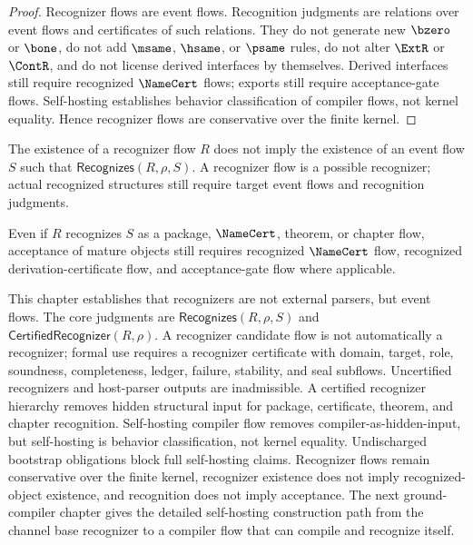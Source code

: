 \begin{proof}
Recognizer flows are event flows. Recognition judgments are relations over event flows and certificates of such relations. They do not generate new $\bzero$ or $\bone$, do not add $\msame$, $\hsame$, or $\psame$ rules, do not alter $\ExtR$ or $\ContR$, and do not license derived interfaces by themselves. Derived interfaces still require recognized $\NameCert$ flows; exports still require acceptance-gate flows. Self-hosting establishes behavior classification of compiler flows, not kernel equality. Hence recognizer flows are conservative over the finite kernel.
\end{proof}

\begin{corollary}
\label{cor:recognizer-generated-existence-not-object-existence}
The existence of a recognizer flow $R$ does not imply the existence of an event flow $S$ such that $\mathsf{Recognizes}(R,\rho,S)$. A recognizer flow is a possible recognizer; actual recognized structures still require target event flows and recognition judgments.
\end{corollary}

\begin{corollary}
\label{cor:recognizer-generated-recognition-not-acceptance}
Even if $R$ recognizes $S$ as a package, $\NameCert$, theorem, or chapter flow, acceptance of mature objects still requires recognized $\NameCert$ flow, recognized derivation-certificate flow, and acceptance-gate flow where applicable.
\end{corollary}

\begin{remark}[Outlook]
\label{rem:recognizer-generated-outlook}
This chapter establishes that recognizers are not external parsers, but event flows. The core judgments are $\mathsf{Recognizes}(R,\rho,S)$ and $\mathsf{CertifiedRecognizer}(R,\rho)$. A recognizer candidate flow is not automatically a recognizer; formal use requires a recognizer certificate with domain, target, role, soundness, completeness, ledger, failure, stability, and seal subflows. Uncertified recognizers and host-parser outputs are inadmissible. A certified recognizer hierarchy removes hidden structural input for package, certificate, theorem, and chapter recognition. Self-hosting compiler flow removes compiler-as-hidden-input, but self-hosting is behavior classification, not kernel equality. Undischarged bootstrap obligations block full self-hosting claims. Recognizer flows remain conservative over the finite kernel, recognizer existence does not imply recognized-object existence, and recognition does not imply acceptance. The next ground-compiler chapter gives the detailed self-hosting construction path from the channel base recognizer to a compiler flow that can compile and recognize itself.
\end{remark}

